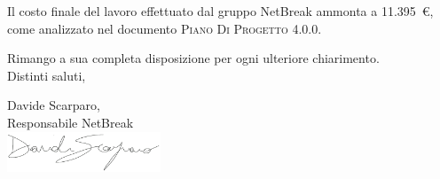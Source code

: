 \documentclass[11pt,a4paper]{letter}
\begin{document}
\begin{letter}
	Il costo finale del lavoro effettuato dal gruppo NetBreak ammonta a \hbox{11.395 \euro{}}, come analizzato nel documento \textsc{Piano Di Progetto 4.0.0}.

\noindent Rimango a sua completa disposizione per ogni ulteriore chiarimento.\\
Distinti saluti,\\
\closing{Davide Scarparo,\\ Responsabile NetBreak\\ \includegraphics[width=1.8in]{DS.png}}


\end{letter}
\end{document}
